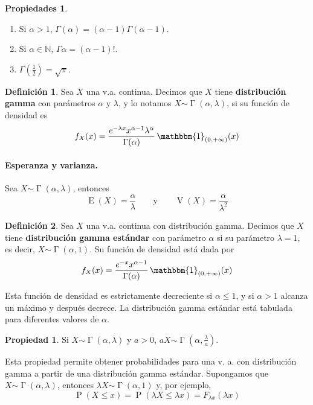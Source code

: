\documentclass[11pt]{article}
\theoremstyle{plain}
\theoremstyle{definition}
\newtheorem*{defi}{Definición}
\newtheorem*{prop}{Propiedad}
\newtheorem*{props}{Propiedades}
\theoremstyle{remark}
\newcommand{\deft}[1]{\textbf{#1}}  %
\newcommand{\proba}{\ensuremath{\operatorname{P}}}  %
\newcommand{\esp}[0]{\ensuremath{\operatorname{E}}}  %
\newcommand{\var}[0]{\ensuremath{\operatorname{V}}}  %
\newcommand{\indi}[1]{\ensuremath{\mathbbm{1}_{#1}}}  %
\newcommand{\dist}[1]{\ensuremath{\sim \operatorname{#1}}}  %
\begin{document}
      \begin{props} \
        \begin{enumerate}
          \item Si $\alpha > 1$, $\Gamma(\alpha) = (\alpha - 1) \Gamma(\alpha - 1)$.
          \item Si $\alpha \in \mathbb{N}$, $\Gamma{\alpha} = (\alpha - 1)!$.
          \item $\Gamma(\frac{1}{2}) = \sqrt{\pi}$.
        \end{enumerate}
      \end{props}

      \begin{defi}
        Sea $X$ una v.a. continua. Decimos que $X$ tiene \deft{distribución gamma} con parámetros $\alpha$ y $\lambda$, y lo notamos $X \dist{\Gamma}(\alpha,\lambda)$, si su función de densidad es
        \[ f_X(x) = \frac{e^{- \lambda x} x^{\alpha - 1} \lambda^\alpha}{\Gamma(\alpha)} \, \indi{(0,+ \infty)}(x) \]
      \end{defi}

      \paragraph{Esperanza y varianza.}
      Sea $X \dist{\Gamma}(\alpha,\lambda)$, entonces
      \[ \esp(X) = \frac{\alpha}{\lambda} \qquad \text{y} \qquad \var(X) = \frac{\alpha}{\lambda^2} \]

      \begin{defi}
        Sea $X$ una v.a. continua con distribución gamma. Decimos que $X$ tiene \deft{distribución gamma estándar} con parámetro $\alpha$ si su parámetro $\lambda = 1$, es decir, $X \dist{\Gamma}(\alpha,1)$. Su función de densidad está dada por
        \[ f_X(x) = \frac{e^{-x} x^{\alpha - 1}}{\Gamma(\alpha)} \, \indi{(0,+\infty)}(x) \]
      \end{defi}

      Esta función de densidad es estrictamente decreciente si $\alpha \leq 1$, y si $\alpha > 1$ alcanza un máximo y después decrece.
      La distribución gamma estándar está tabulada para diferentes valores de $\alpha$.

      \begin{prop}
        Si $X \dist{\Gamma}(\alpha,\lambda)$ y $a > 0$, $a X \dist{\Gamma}(\alpha, \frac{\lambda}{a})$.

        Esta propiedad permite obtener probabilidades para una v. a. con distribución gamma a partir de una distribución gamma estándar. Supongamos que $X \dist{\Gamma}(\alpha,\lambda)$, entonces $\lambda X \dist{\Gamma}(\alpha,1)$ y, por ejemplo,
        \[ \proba(X \leq x) = \proba(\lambda X \leq \lambda x) = F_{\lambda x} (\lambda x) \]
      \end{prop}
\end{document}
